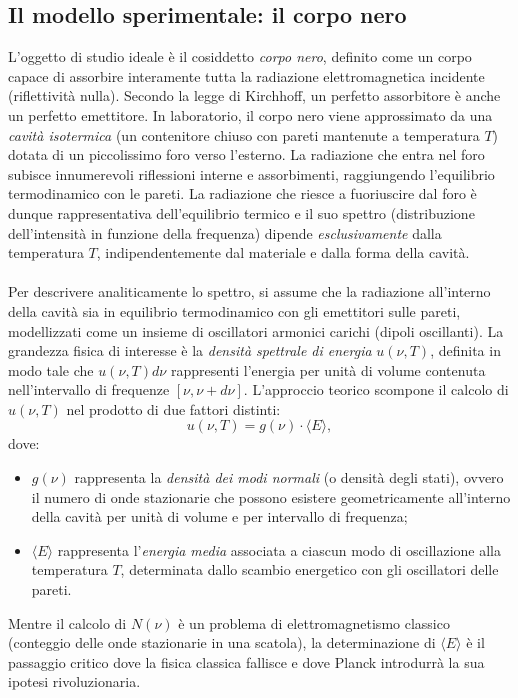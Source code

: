 \documentclass[a4paper,11pt]{report}
\begin{document}
\subsection{Il modello sperimentale: il corpo nero}
L'oggetto di studio ideale è il cosiddetto \textit{corpo nero}, definito come un corpo capace di assorbire interamente tutta la radiazione elettromagnetica incidente (riflettività nulla). Secondo la legge di Kirchhoff, un perfetto assorbitore è anche un perfetto emettitore.
In laboratorio, il corpo nero viene approssimato da una \textit{cavità isotermica} (un contenitore chiuso con pareti mantenute a temperatura $T$) dotata di un piccolissimo foro verso l'esterno. La radiazione che entra nel foro subisce innumerevoli riflessioni interne e assorbimenti, raggiungendo l'equilibrio termodinamico con le pareti.
La radiazione che riesce a fuoriuscire dal foro è dunque rappresentativa dell'equilibrio termico e il suo spettro (distribuzione dell'intensità in funzione della frequenza) dipende \textit{esclusivamente} dalla temperatura $T$, indipendentemente dal materiale e dalla forma della cavità. \\
\\
Per descrivere analiticamente lo spettro, si assume che la radiazione all'interno della cavità sia in equilibrio termodinamico con gli emettitori sulle pareti, modellizzati come un insieme di oscillatori armonici carichi (dipoli oscillanti).
La grandezza fisica di interesse è la \textit{densità spettrale di energia} $u(\nu, T)$, definita in modo tale che $u(\nu, T)d\nu$ rappresenti l'energia per unità di volume contenuta nell'intervallo di frequenze $[\nu, \nu + d\nu]$.
L'approccio teorico scompone il calcolo di $u(\nu, T)$ nel prodotto di due fattori distinti:
\begin{equation}
    u(\nu, T) = g(\nu) \cdot \langle E \rangle,
    \label{eq:fattorizzazione_planck}
\end{equation}
dove:
\begin{itemize}
    \item $g(\nu)$ rappresenta la \textit{densità dei modi normali} (o densità degli stati), ovvero il numero di onde stazionarie che possono esistere geometricamente all'interno della cavità per unità di volume e per intervallo di frequenza;
    \item $\langle E \rangle$ rappresenta l'\textit{energia media} associata a ciascun modo di oscillazione alla temperatura $T$, determinata dallo scambio energetico con gli oscillatori delle pareti.
\end{itemize}
Mentre il calcolo di $N(\nu)$ è un problema di elettromagnetismo classico (conteggio delle onde stazionarie in una scatola), la determinazione di $\langle E \rangle$ è il passaggio critico dove la fisica classica fallisce e dove Planck introdurrà la sua ipotesi rivoluzionaria.
\end{document}

